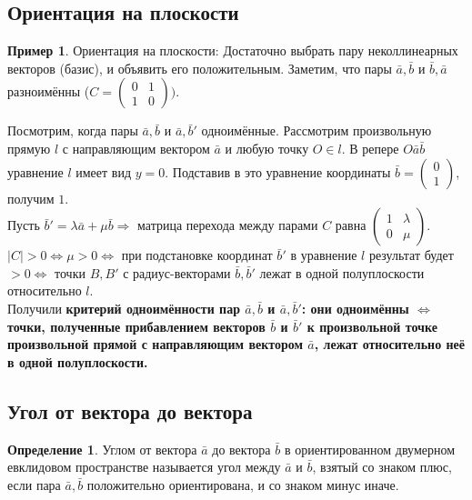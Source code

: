 \documentclass[a4paper, 12pt]{article}
\theoremstyle{definition}
\newtheorem*{definition}{Определение}
\newtheorem*{example}{Пример}
\begin{document}
	\subsection{Ориентация на плоскости}
	\begin{example} Ориентация на плоскости:
		Достаточно выбрать пару неколлинеарных векторов (базис), и объявить его положительным. Заметим, что пары $\bar{a}, \bar{b}$ и $\bar{b}, \bar{a}$ разноимённы ($C = \begin{pmatrix} 0&1\\1&0\end{pmatrix})$.

		Посмотрим, когда пары $\bar{a}, \bar{b}$ и $\bar{a}, \bar{b}'$ одноимённые. Рассмотрим произвольную прямую $l$ с направляющим вектором $\bar{a}$ и любую точку $O \in l$. В репере $O\bar{a}\bar{b}$ уравнение $l$ имеет вид $y = 0$. Подставив в это уравнение координаты $\bar{b} = \begin{pmatrix} 0\\1\end{pmatrix}$, получим $1$.\\
		Пусть $\bar{b}' = \lambda\bar{a} + \mu\bar{b} \Rightarrow$ матрица перехода между парами $C$ равна $\begin{pmatrix} 1&\lambda\\0&\mu\end{pmatrix}$. $|C| > 0 \Leftrightarrow \mu > 0 \Leftrightarrow$ при подстановке координат $\bar{b}'$ в уравнение $l$ результат будет $> 0 \Leftrightarrow$ точки $B, B'$ с радиус-векторами $\bar{b}, \bar{b}'$ лежат в одной полуплоскости относительно $l$.\\
		Получили \bfseries критерий одноимённости пар $\bar{a}, \bar{b}$ и $\bar{a}, \bar{b}'$: они одноимённы $\Leftrightarrow$ точки, полученные прибавлением векторов $\bar{b}$ и $\bar{b}'$ к произвольной точке произвольной прямой с направляющим вектором $\bar{a}$, лежат относительно неё в одной полуплоскости. \mdseries 
	\end{example}
	\subsection{Угол от вектора до вектора}
	\begin{definition}
		Углом от вектора $\bar{a}$ до вектора $\bar{b}$ в ориентированном двумерном евклидовом пространстве называется угол между $\bar{a}$ и $\bar{b}$, взятый со знаком плюс, если пара $\bar{a}, \bar{b}$ положительно ориентирована, и со знаком минус иначе.
	\end{definition}
\end{document}
